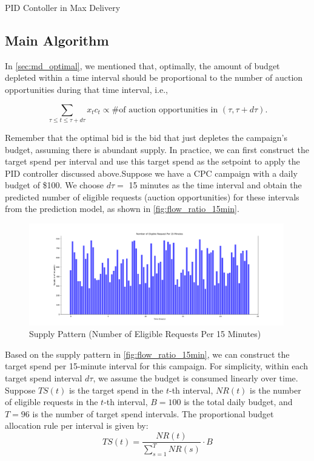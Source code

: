 \documentclass[../main.tex]{subfiles}
\begin{document}
	\begin{section}{PID Contoller in Max Delivery}
		\subsection*{Main Algorithm}
		In \autoref{sec:md_optimal}, we mentioned that, optimally, the amount of budget depleted within a time interval should be proportional to the number of auction opportunities during that time interval, i.e.,

		\[
		\sum_{\tau \leq t \leq \tau + d\tau} x_t c_t \propto \text{\# of auction opportunities in } (\tau, \tau + d\tau).
		\]
		
		Remember that the optimal bid is the bid that just depletes the campaign's budget, assuming there is abundant supply. In practice, we can first construct the target spend per interval and use this target spend as the setpoint to apply the PID controller discussed above.Suppose we have a CPC campaign with a daily budget of \$100. We choose $d\tau =$ 15 minutes as the time interval and obtain the predicted number of eligible requests (auction opportunities) for these intervals from the prediction model, as shown in \autoref{fig:flow_ratio_15min}.
		
		\begin{figure}[H]
			\centering
			\includegraphics[width=0.99\textwidth]{../Images/flow_ratio_15min.png}
			\caption{Supply Pattern (Number of Eligible Requests Per 15 Minutes)}
			\label{fig:flow_ratio_15min}
		\end{figure}
		
		Based on the supply pattern in \autoref{fig:flow_ratio_15min}, we can construct the target spend per 15-minute interval for this campaign. For simplicity, within each target spend interval $d\tau$, we assume the budget is consumed linearly over time. Suppose \(TS(t)\) is the target spend in the \(t\)-th interval, \(NR(t)\) is the number of eligible requests in the \(t\)-th interval, \(B = 100\) is the total daily budget, and \(T = 96\) is the number of target spend intervals. The proportional budget allocation rule per interval is given by:
			\[
				TS(t) = \frac{NR(t)}{\sum_{s=1}^{T} NR(s)} \cdot B
			\]
			

\end{section}
\end{document}
